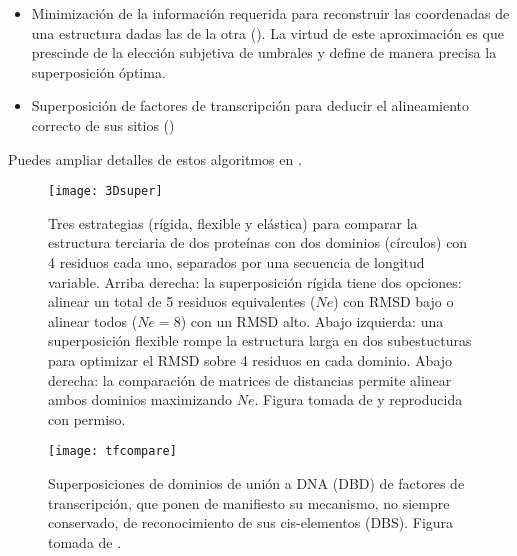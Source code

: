 \begin{itemize}
\item Minimizaci\'{o}n de la informaci\'{o}n requerida para reconstruir las coordenadas de una estructura dadas las de la otra
(). La virtud de este aproximaci\'{o}n es que prescinde 
de la elecci\'{o}n subjetiva de umbrales y define de manera precisa la superposici\'{o}n \'{o}ptima.

\item Superposici\'{o}n de factores de transcripci\'{o}n para deducir el alineamiento correcto de sus sitios  
()

\end{itemize}

Puedes ampliar detalles de estos algoritmos en \citet{pascual_garcia_alberto_2014_1066346}.


\begin{figure}
\begin{center} 
\texttt{[image: 3Dsuper]}
\caption%
{
Tres estrategias (r\'{i}gida, flexible y el\'{a}stica) para comparar la estructura terciaria de dos prote\'{i}nas 
con dos dominios (c\'{i}rculos) con 4 residuos cada uno, separados por una secuencia de longitud variable.
Arriba derecha: la superposici\'{o}n r\'{i}gida tiene dos opciones: alinear un total de 5 residuos equivalentes ($Ne$) con RMSD bajo 
o alinear todos ($Ne=8$) con un RMSD alto. 
Abajo izquierda: una superposici\'{o}n flexible rompe la estructura larga en dos subestucturas para optimizar el RMSD sobre 4 residuos en cada dominio.
Abajo derecha: la comparaci\'{o}n de matrices de distancias permite alinear ambos dominios maximizando $Ne$.
Figura tomada de \citet{Hasegawa2009} y reproducida con permiso.
}
\label{fig:dali}
\end{center}
\end{figure}


\begin{figure}
\begin{center} 
\texttt{[image: tfcompare]}
\caption%
{
Superposiciones de dominios de uni\'{o}n a DNA (DBD) de factores de transcripci\'{o}n, que ponen de manifiesto 
su mecanismo, no siempre conservado, de reconocimiento de sus cis-elementos (DBS). 
Figura tomada de \citet{Sebastian2013}.
}
\label{fig:tfcompare}
\end{center}
\end{figure}

